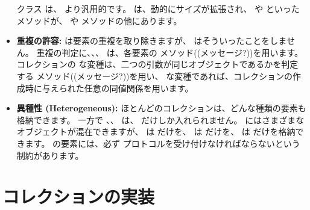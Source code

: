 \documentclass[a4paper,10pt,twoside]{book}
\begin{document}
\begin{itemize}
         クラス は、 より汎用的です。 は、動的にサイズが拡張され、 や  といったメソッドが、 や  メソッドの他にあります。
  
  \item {\bf 重複の許容:}
  	 は要素の重複を取り除きますが、 はそういったことをしません。
	重複の判定に、、、 は、各要素の \ct{=} メソッド((メッセージ?))を用います。コレクションの  な変種は、二つの引数が同じオブジェクトであるかを判定する \ct{==} メソッド((メッセージ?))を用い、 な変種であれば、コレクションの作成時に与えられた任意の同値関係を用います。

  \item {\bf 異種性 (Heterogeneous):}
        ほとんどのコレクションは、どんな種類の要素も格納できます。
        一方で 、、 は、 だけしか入れられません。
         にはさまざまなオブジェクトが混在できますが、 は  だけを、 は  だけを、 は  だけを格納できます。
	 の要素には、必ず  プロトコルを受け付けなければならないという制約があります。

\end{itemize}


\section{コレクションの実装}
\end{document}
